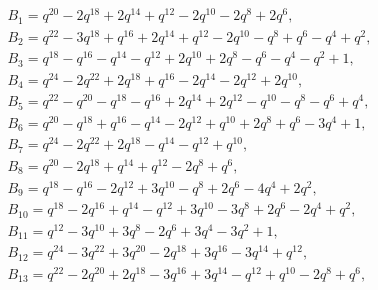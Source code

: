 \documentclass[10pt,a4paper]{amsart}
\numberwithin{equation}{section}
\theoremstyle{definition}
\newcommand{\flac}[2]{#1}
\begin{document}
\begin{gather*}
 B_1 =
\flac{q^{20}}{a^2}-\flac{2q^{18}}{a^2}+\flac{2q^{14}}{a^2}+\flac{q^{12}}{a^2}-\flac{2q^{10}}{a^2}-\flac{2q^{8}}{a^2}+\flac{2q^{6}}{a^2},\\
 B_2 =
\flac{q^{22}}{a^2}-\flac{3q^{18}}{a^2}+\flac{q^{16}}{a^2}+\flac{2q^{14}}{a^2}+\flac{q^{12}}{a^2}-\flac{2q^{10}}{a^2}-\flac{q^{8}}{a^2}+\flac{q^{6}}{a^2}-\flac{q^{4}}{a^2}+\flac{q^{2}}{a^2}, \\
 B_3 =
\flac{q^{18}}{a^2}-\flac{q^{16}}{a^2}-\flac{q^{14}}{a^2}-\flac{q^{12}}{a^2}+\flac{2q^{10}}{a^2}+\flac{2q^{8}}{a^2}-\flac{q^{6}}{a^2}-\flac{q^{4}}{a^2}-\flac{q^{2}}{a^2}+\flac{1}{a^2}, \\
 B_4 =
\flac{q^{24}}{a^2}-\flac{2q^{22}}{a^2}+\flac{2q^{18}}{a^2}+\flac{q^{16}}{a^2}-\flac{2q^{14}}{a^2}-\flac{2q^{12}}{a^2}+\flac{2q^{10}}{a^2}, \\
 B_5 =
\flac{q^{22}}{a^2}-\flac{q^{20}}{a^2}-\flac{q^{18}}{a^2}-\flac{q^{16}}{a^2}+\flac{2q^{14}}{a^2}+\flac{2q^{12}}{a^2}-\flac{q^{10}}{a^2}-\flac{q^{8}}{a^2}-\flac{q^{6}}{a^2}+\flac{q^{4}}{a^2}, \\
 B_6 =
\flac{q^{20}}{a^2}-\flac{q^{18}}{a^2}+\flac{q^{16}}{a^2}-\flac{q^{14}}{a^2}-\flac{2q^{12}}{a^2}+\flac{q^{10}}{a^2}+\flac{2q^{8}}{a^2}+\flac{q^{6}}{a^2}-\flac{3q^{4}}{a^2}+\flac{1}{a^2}, \\
 B_7 =
\flac{q^{24}}{a^2}-\flac{2q^{22}}{a^2}+\flac{2q^{18}}{a^2}-\flac{q^{14}}{a^2}-\flac{q^{12}}{a^2}+\flac{q^{10}}{a^2}, \\
 B_8 =
\flac{q^{20}}{a^2}-\flac{2q^{18}}{a^2}+\flac{q^{14}}{a^2}+\flac{q^{12}}{a^2}-\flac{2q^{8}}{a^2}+\flac{q^{6}}{a^2}, \\
 B_9 =
\flac{q^{18}}{a^2}-\flac{q^{16}}{a^2}-\flac{2q^{12}}{a^2}+\flac{3q^{10}}{a^2}-\flac{q^{8}}{a^2}+\flac{2q^{6}}{a^2}-\flac{4q^{4}}{a^2}+\flac{2q^{2}}{a^2}, \\
 B_{10} =
\flac{q^{18}}{a^2}-\flac{2q^{16}}{a^2}+\flac{q^{14}}{a^2}-\flac{q^{12}}{a^2}+\flac{3q^{10}}{a^2}-\flac{3q^{8}}{a^2}+\flac{2q^{6}}{a^2}-\flac{2q^{4}}{a^2}+\flac{q^{2}}{a^2}, \\
 B_{11} =
\flac{q^{12}}{a^2}-\flac{3q^{10}}{a^2}+\flac{3q^{8}}{a^2}-\flac{2q^{6}}{a^2}+\flac{3q^{4}}{a^2}-\flac{3q^{2}}{a^2}+\flac{1}{a^2}, \\
 B_{12} =
\flac{q^{24}}{a^2}-\flac{3q^{22}}{a^2}+\flac{3q^{20}}{a^2}-\flac{2q^{18}}{a^2}+\flac{3q^{16}}{a^2}-\flac{3q^{14}}{a^2}+\flac{q^{12}}{a^2}, \\
 B_{13} =
\flac{q^{22}}{a^2}-\flac{2q^{20}}{a^2}+\flac{2q^{18}}{a^2}-\flac{3q^{16}}{a^2}+\flac{3q^{14}}{a^2}-\flac{q^{12}}{a^2}+\flac{q^{10}}{a^2}-\flac{2q^{8}}{a^2}+\flac{q^{6}}{a^2}, \\

\end{gather*}
\end{document}
